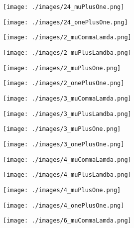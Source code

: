 \documentclass[landscape,11pt]{article}
\begin{document}
\begin{figure}
\end{figure}\begin{figure}
    \centering
    \texttt{[image: ./images/24\_muPlusOne.png]}
\end{figure}\begin{figure}
    \centering
    \texttt{[image: ./images/24\_onePlusOne.png]}
\end{figure}\begin{figure}
    \centering
    \texttt{[image: ./images/2\_muCommaLamda.png]}
\end{figure}\begin{figure}
    \centering
    \texttt{[image: ./images/2\_muPlusLamdba.png]}
\end{figure}\begin{figure}
    \centering
    \texttt{[image: ./images/2\_muPlusOne.png]}
\end{figure}\begin{figure}
    \centering
    \texttt{[image: ./images/2\_onePlusOne.png]}
\end{figure}\begin{figure}
    \centering
    \texttt{[image: ./images/3\_muCommaLamda.png]}
\end{figure}\begin{figure}
    \centering
    \texttt{[image: ./images/3\_muPlusLamdba.png]}
\end{figure}\begin{figure}
    \centering
    \texttt{[image: ./images/3\_muPlusOne.png]}
\end{figure}\begin{figure}
    \centering
    \texttt{[image: ./images/3\_onePlusOne.png]}
\end{figure}\begin{figure}
    \centering
    \texttt{[image: ./images/4\_muCommaLamda.png]}
\end{figure}\begin{figure}
    \centering
    \texttt{[image: ./images/4\_muPlusLamdba.png]}
\end{figure}\begin{figure}
    \centering
    \texttt{[image: ./images/4\_muPlusOne.png]}
\end{figure}\begin{figure}
    \centering
    \texttt{[image: ./images/4\_onePlusOne.png]}
\end{figure}\begin{figure}
    \centering
    \texttt{[image: ./images/6\_muCommaLamda.png]}
\end{figure}\begin{figure}

\end{figure}
\end{document}
